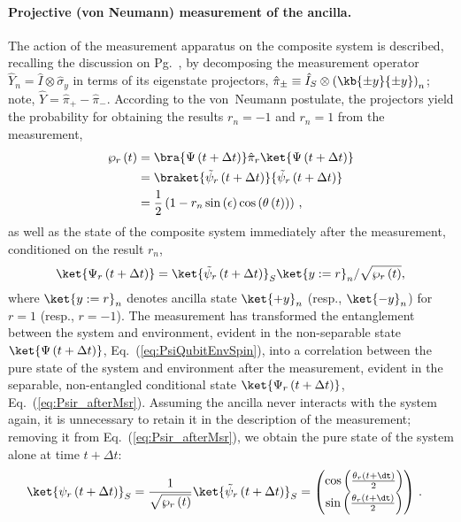 \paragraph{Projective (von Neumann) measurement of the ancilla. }

The action of the measurement apparatus on the composite system is
described, recalling the discussion on Pg.~\pageref{par:Projective-(von-Neumann)},
by decomposing the measurement operator $\hat{Y}_{n}=\hat{I}\otimes\hat{\sigma}_{y}$
in terms of its  eigenstate projectors, $\hat{\pi}_{\pm}\equiv\hat{I}_{S}\otimes\left(\kb{\pm y}{\pm y}\right)_{n}$;
note, $\hat{Y}=\hat{\pi}_{+}-\hat{\pi}_{-}$. According to the von~Neumann
postulate, the projectors yield the probability for obtaining the
results $r_{n}=-1$ and $r_{n}=1$ from the measurement, 
\begin{align}
\wp_{r}\left(t\right) & =\bra{\Psi\left(t+\Delta t\right)}\hat{\pi}_{r}\ket{\Psi\left(t+\Delta t\right)}\nonumber \\
 & =\braket{\tilde{\psi}_{r}\left(t+\Delta t\right)}{\tilde{\psi}_{r}\left(t+\Delta t\right)}\nonumber \\
 & =\frac{1}{2}\left(1-r_{n}\sin\left(\epsilon\right)\cos\left(\theta\left(t\right)\right)\right)\,,\label{eq:PflyingSpinPM1}
\end{align}
as well as the state of the composite system immediately after the
measurement, conditioned on the result $r_{n}$, 
\begin{equation}
\ket{\Psi_{r}\left(t+\Delta t\right)}=\ket{\tilde{\psi}_{r}\left(t+\Delta t\right)}_{S}\ket{y:=r}_{n}/\sqrt{\wp_{r}\left(t\right)},\label{eq:Psir_afterMsr}
\end{equation}
where $\ket{y:=r}_{n}$ denotes ancilla state $\ket{+y}_{n}$ (resp.,
$\ket{-y}_{n}$) for $r=1$ (resp., $r=-1$). The measurement has
transformed the entanglement between the system and environment, evident
in the non-separable state $\ket{\Psi\left(t+\Delta t\right)}$, Eq.~(\ref{eq:PsiQubitEnvSpin}),
into a correlation between the pure state of the system and environment
after the measurement, evident in the separable, non-entangled conditional
state $\ket{\Psi_{r}\left(t+\Delta t\right)}$, Eq.~(\ref{eq:Psir_afterMsr}).
Assuming the ancilla never interacts with the system again, it is
unnecessary to retain it in the description of the measurement; removing
it from Eq.~(\ref{eq:Psir_afterMsr}), we obtain the pure state of
the system alone at time $t+\Delta t$:
\begin{align}
\ket{\psi_{r}\left(t+\Delta t\right)}_{S} & =\frac{1}{\sqrt{\wp_{r}\left(t\right)}}\ket{\tilde{\psi}_{r}\left(t+\Delta t\right)}_{S}=\begin{pmatrix}\cos\left(\frac{\theta_{r}\left(t+\dt\right)}{2}\right)\\
\sin\left(\frac{\theta_{r}\left(t+\dt\right)}{2}\right)
\end{pmatrix}\,.\label{eq:SpinModel:postState}
\end{align}
